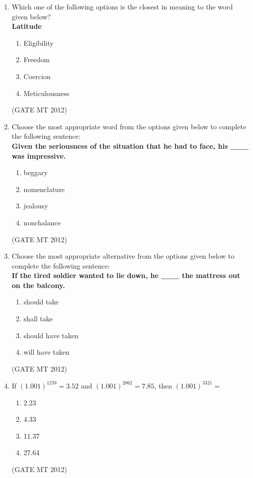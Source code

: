 \documentclass[journal, 11pt, onecolumn]{IEEEtran}
\theoremstyle{remark}
\begin{document}
\begin{enumerate}
\item Which one of the following options is the closest in meaning to the word given below?\\[0.5em]
\textbf{Latitude}
\begin{multicols}{2}
\begin{enumerate}  
\item Eligibility
\item Freedom
\item Coercion
\item Meticulousness
\end{enumerate}
\end{multicols}
\hfill(GATE MT 2012)

\item Choose the most appropriate word from the options given below to complete the following sentence:\\[0.5em]
\textbf{Given the seriousness of the situation that he had to face, his \_\_\_ was impressive.}
\begin{multicols}{2}
\begin{enumerate}  
\item beggary
\item nomenclature
\item jealousy
\item nonchalance
\end{enumerate}
\end{multicols}
\hfill(GATE MT 2012)

\item Choose the most appropriate alternative from the options given below to complete the following sentence:\\[0.5em]
\textbf{If the tired soldier wanted to lie down, he \_\_\_ the mattress out on the balcony.}
\begin{multicols}{2}
\begin{enumerate}  
\item should take
\item shall take
\item should have taken
\item will have taken
\end{enumerate}
\end{multicols}
\hfill(GATE MT 2012)

\item If $(1.001)^{1259} = 3.52$ and $ (1.001)^{2062} = 7.85 $, then $ (1.001)^{3321} = $
\begin{multicols}{2}
\begin{enumerate}  
\item 2.23
\item 4.33
\item 11.37
\item 27.64
\end{enumerate}
\end{multicols}
\hfill(GATE MT 2012)


\end{enumerate}
\end{document}
